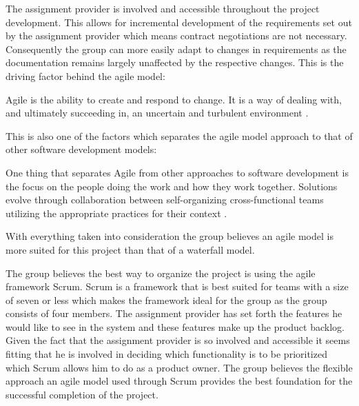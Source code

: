 The assignment provider is involved and accessible throughout the project development.
This allows for incremental development of the requirements set out by the assignment provider which means contract negotiations are not necessary.
Consequently the group can more easily adapt to changes in requirements as the documentation remains largely unaffected by the respective changes.
This is the driving factor behind the agile model:
\begin{displayquote}
Agile is the ability to create and respond to change.
It is a way of dealing with, and ultimately succeeding in, an uncertain and turbulent environment \cite{what-is-agile}.
\end{displayquote}
This is also one of the factors which separates the agile model approach to that of other software development models:

\begin{displayquote}
One thing that separates Agile from other approaches to software development is the focus on the people doing the work and how they work together.
Solutions evolve through collaboration between self-organizing cross-functional teams utilizing the appropriate practices for their context \cite{what-is-agile-software-development}.
\end{displayquote}
With everything taken into consideration the group believes an agile model is more suited for this project than that of a waterfall model.

The group believes the best way to organize the project is using the agile framework Scrum.
Scrum is a framework that is best suited for teams with a size of seven or less \cite{software-engineering-scrum-size} which makes the framework ideal for the group as the group consists of four members.
The assignment provider has set forth the features he would like to see in the system and these features make up the product backlog.
Given the fact that the assignment provider is so involved and accessible it seems fitting that he is involved in deciding which functionality is to be prioritized which Scrum allows him to do as a product owner.
The group believes the flexible approach an agile model used through Scrum provides the best foundation for the successful completion of the project.

